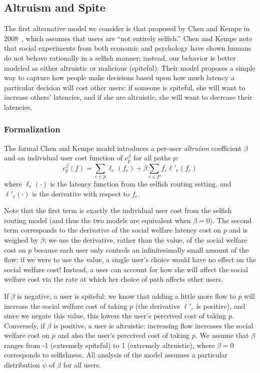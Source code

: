 \subsection{Altruism and Spite}
The first alternative model we consider is that proposed by Chen and Kempe in 2008~\cite{chen}, which assumes that users are ``not entirely selfish.''
Chen and Kempe note that social experiments from both economic and psychology have shown humans do not behave rationally in a selfish manner; instead, our behavior is better modeled as either altruistic or malicious (spiteful).
Their model proposes a simple way to capture how people make decisions based upon how much latency a particular decision will cost other users: if someone is spiteful, she will want to increase others' latencies, and if she are altruistic, she will want to decrease their latencies.

\subsubsection{Formalization}
The formal Chen and Kempe model introduces a per-user \emph{altruism} coefficient $\beta$ and an individual user cost function
of $c^\beta_p$ for all paths $p$:
$$c^\beta_p(f) = \sum_{e \in p} \ell_e(f_e) + \beta\sum_{e\in P} f_e\ell'_e(f_e)$$
where $\ell_e(\cdot)$ is the latency function from the selfish routing setting, and $\ell'_e(\cdot)$ is the derivative with respect to $f_e$.

Note that the first term is exactly the individual user cost from the selfish routing model (and thus the two models are equivalent when $\beta = 0$). 
The second term corresponds to the derivative of the social welfare latency cost on $p$ and is weighed by $\beta$; we use the derivative, rather than the value, of the social welfare cost on $p$ because each user only controls an infinitesimally small amount of the flow: if we were to use the value, a single user's choice would have no effect on the social welfare cost! 
Instead, a user can account for how she will affect the social welfare cost via the rate at which her choice of path affects other users.

If $\beta$ is negative, a user is spiteful: we know that adding a little more flow to $p$ will increase the social welfare cost of taking $p$ (the derivative $\ell'_e$ is positive), and since we negate this value, this lowers the user's perceived cost of taking $p$.
Conversely, if $\beta$ is positive, a user is altruistic: increasing flow increases the social welfare cost on $p$ and also the user's perceived cost of taking $p$.
We assume that $\beta$ ranges from -1 (extremely spiteful) to 1 (extremely altruistic), where $\beta=0$ corresponds to selfishness.
All analysis of the model assumes a particular distribution $\psi$ of $\beta$ for all users. 

